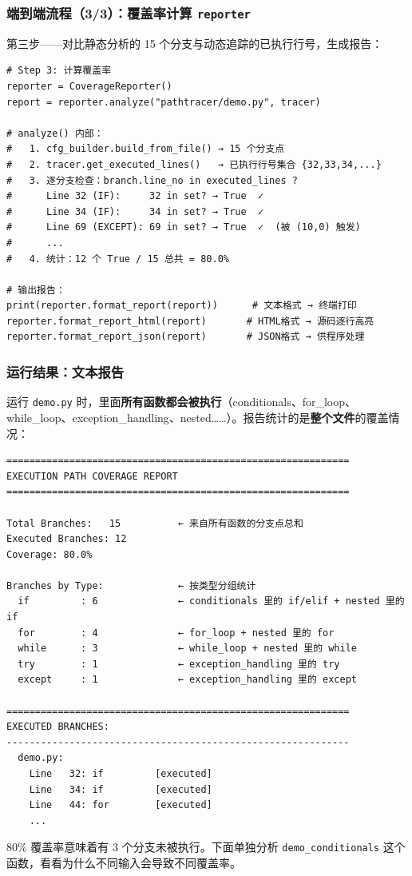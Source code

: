 \documentclass[presentation,aspectratio=169,fontset=none]{ctexbeamer}
\begin{document}

\begin{frame}[fragile]
\frametitle{端到端流程（3/3）：覆盖率计算 \texttt{reporter}}
{\scriptsize 第三步——对比静态分析的 15 个分支与动态追踪的已执行行号，生成报告：}

\vspace{0.05cm}
{\tiny
\begin{verbatim}
# Step 3: 计算覆盖率
reporter = CoverageReporter()
report = reporter.analyze("pathtracer/demo.py", tracer)

# analyze() 内部：
#   1. cfg_builder.build_from_file() → 15 个分支点
#   2. tracer.get_executed_lines()   → 已执行行号集合 {32,33,34,...}
#   3. 逐分支检查：branch.line_no in executed_lines ?
#      Line 32 (IF):     32 in set? → True  ✓
#      Line 34 (IF):     34 in set? → True  ✓
#      Line 69 (EXCEPT): 69 in set? → True  ✓  (被 (10,0) 触发)
#      ...
#   4. 统计：12 个 True / 15 总共 = 80.0%

# 输出报告：
print(reporter.format_report(report))      # 文本格式 → 终端打印
reporter.format_report_html(report)       # HTML格式 → 源码逐行高亮
reporter.format_report_json(report)       # JSON格式 → 供程序处理
\end{verbatim}}
\end{frame}


\begin{frame}[fragile]
\frametitle{运行结果：文本报告}
{\footnotesize 运行 \texttt{demo.py} 时，里面\textbf{所有函数都会被执行}（conditionals、for\_loop、while\_loop、exception\_handling、nested……）。报告统计的是\textbf{整个文件}的覆盖情况：}

\vspace{0.05cm}
{\tiny
\begin{verbatim}
============================================================
EXECUTION PATH COVERAGE REPORT
============================================================

Total Branches:   15          ← 来自所有函数的分支点总和
Executed Branches: 12
Coverage: 80.0%

Branches by Type:             ← 按类型分组统计
  if         : 6              ← conditionals 里的 if/elif + nested 里的 if
  for        : 4              ← for_loop + nested 里的 for
  while      : 3              ← while_loop + nested 里的 while
  try        : 1              ← exception_handling 里的 try
  except     : 1              ← exception_handling 里的 except

============================================================
EXECUTED BRANCHES:
------------------------------------------------------------
  demo.py:
    Line   32: if         [executed]
    Line   34: if         [executed]
    Line   44: for        [executed]
    ...
\end{verbatim}}

\vspace{0.05cm}
{\footnotesize 80\% 覆盖率意味着有 3 个分支未被执行。下面单独分析 \texttt{demo\_conditionals} 这个函数，看看为什么不同输入会导致不同覆盖率。}
\end{frame}
\end{document}
